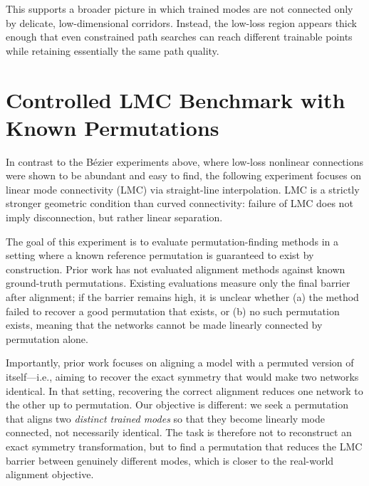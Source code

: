 \documentclass[11pt,a4paper]{report}
\begin{document}
This supports a broader picture in which trained modes are not connected only by delicate, low-dimensional corridors. Instead, the low-loss region appears thick enough that even constrained path searches can reach different trainable points while retaining essentially the same path quality.

\section{Controlled LMC Benchmark with Known Permutations}
\label{sec:controlled_benchmark}

In contrast to the Bézier experiments above, where low-loss nonlinear connections were shown to be abundant and easy to find, the following experiment focuses on linear mode connectivity (LMC) via straight-line interpolation. LMC is a strictly stronger geometric condition than curved connectivity: failure of LMC does not imply disconnection, but rather linear separation.

The goal of this experiment is to evaluate permutation-finding methods in a setting where a known reference permutation is guaranteed to exist by construction. Prior work has not evaluated alignment methods against known ground-truth permutations. Existing evaluations measure only the final barrier after alignment; if the barrier remains high, it is unclear whether (a) the method failed to recover a good permutation that exists, or (b) no such permutation exists, meaning that the networks cannot be made linearly connected by permutation alone.

Importantly, prior work \citet{entezari2021role} focuses on aligning a model with a permuted version of itself---i.e., aiming to recover the exact symmetry that would make two networks identical. In that setting, recovering the correct alignment reduces one network to the other up to permutation. Our objective is different: we seek a permutation that aligns two \emph{distinct trained modes} so that they become linearly mode connected, not necessarily identical. The task is therefore not to reconstruct an exact symmetry transformation, but to find a permutation that reduces the LMC barrier between genuinely different modes, which is closer to the real-world alignment objective.
\end{document}
